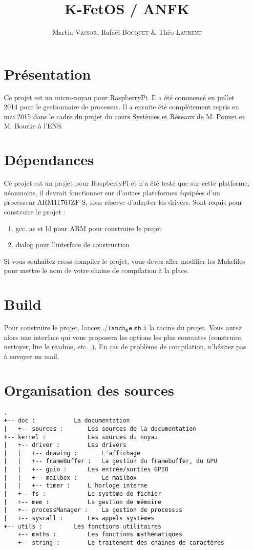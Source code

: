 \documentclass[a4paper,11pt]{article}
\title{K-FetOS / ANFK}
\author{Martin \textsc{Vassor}, Rafaël \textsc{Bocquet} \& Théo \textsc{Laurent}}
\begin{document}
\maketitle
\tableofcontents
\section{Présentation}
Ce projet est un micro-noyau pour RaspberryPi. Il a été commencé en juillet 2014
pour le gestionnaire de processus. Il a ensuite été complètement repris en mai 
2015 dans le cadre du projet du cours Systèmes et Réseaux de M. Pouzet et 
M. Bourke à l'ENS.
\section{Dépendances}
Ce projet est un projet pour RaspberryPi et n'a été testé que sur cette 
platforme, néanmoins, il devrait fonctionner sur d'autres plateformes équipées 
d'un processeur ARM1176JZF-S, sous réserve d'adapter les drivers.
Sont requis pour construire le projet : 
\begin{enumerate}
	\item gcc, as et ld pour ARM pour construire le projet
	\item dialog pour l'interface de construction
\end{enumerate}
Si vous souhaitez cross-compiler le projet, vous devez aller modifier les 
Makefiles pour mettre le nom de votre chaine de compilation à la place.

\section{Build}
Pour construire le projet, lancez $\mathtt{./lanch_me.sh}$ à la racine du 
projet. Vous aurez alors une interface qui vous proposera les options les plus
courantes (construire, nettoyer, lire le readme, etc...). En cas de problème de
compilation, n'hésitez pas à envoyer un mail.

\section{Organisation des sources}
\begin{verbatim}
.
+-- doc	:			La documentation
|   +-- sources	:		Les sources de la documentation
+-- kernel :			Les sources du noyau
|   +-- driver :		Les drivers
|   |   +-- drawing :		L'affichage
|   |   +-- frameBuffer :	La gestion du framebuffer, du GPU
|   |   +-- gpio :		Les entrée/sorties GPIO
|   |   +-- mailbox :		Le mailbox
|   |   +-- timer :		L'horloge interne
|   +-- fs :			Le système de fichier
|   +-- mem :			La gestion de mémoire
|   +-- processManager :	La gestion de processus
|   +-- syscall	:		Les appels systèmes
+-- utils :			Les fonctions utilitaires
    +-- maths :			Les fonctions mathématiques
    +-- string :		Le traitement des chaines de caractères
\end{verbatim}
\end{document}
